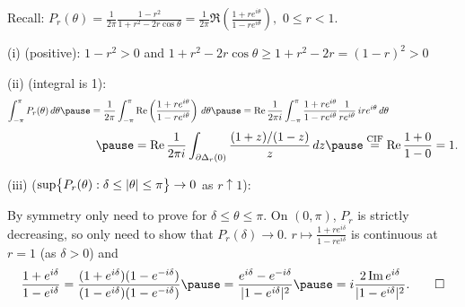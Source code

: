 \documentclass[10pt,aspectratio=169]{beamer}
\begin{document}
\begin{frame}
Recall: $
P_r(\theta)
= \frac{1}{2\pi} \frac{1-r^2}{1+r^2-2r \cos \theta}
= \frac{1}{2\pi}
\Re \left( \frac{1+re^{i\theta}}{1-re^{i\theta}}\right) ,
$
\quad
$0 \leq r < 1$.
\pause
\medskip

(i) (positive): \quad $1-r^2 > 0$
\quad
and
\quad
$1+r^2-2r \cos\theta \geq 1+r^2-2r = {(1-r)}^2 > 0$

\medskip
\pause

(ii) (integral is 1):
\[
\int_{-\pi}^{\pi}
P_r(\theta) \, d\theta
\pause
=
\frac{1}{2\pi}
\int_{-\pi}^{\pi}
\Re
\left(
\frac{1+re^{i\theta}}{1-re^{i\theta}}
\right)
\, d\theta
\pause
=
\Re
\frac{1}{2\pi i}
\int_{-\pi}^{\pi}
\frac{1+re^{i\theta}}{1-re^{i\theta}} \frac{1}{re^{i\theta}} \,
ire^{i\theta}
\, d\theta
\hspace*{1in}
\]
\[
\hspace*{1in}
\pause
= 
\Re
\frac{1}{2\pi i}
\int_{\partial \Delta_r(0)}
\frac{(1+z)/(1-z)}{z} \, dz
\pause
\overset{\text{CIF}}{=}
\Re \frac{1+0}{1-0} = 1 .
\]
\pause

(iii) ($\sup \bigl\{P_r(\theta) : \delta \leq \left\lvert {\theta} \right\rvert \leq
\pi \bigr\} \to 0$ as $r \uparrow 1$):


\pause
By symmetry only need to prove for $\delta \leq \theta \leq \pi$.
\pause
\quad
On $(0,\pi)$, $P_r$ is strictly decreasing, so only need to show
that $P_r(\delta) \to 0$.
\pause
\quad
$r \mapsto
\frac{1+re^{i\delta}}{1-re^{i\delta}}$
is continuous at $r=1$ (as $\delta > 0$) and \pause
\[
\frac{1+e^{i\delta}}{1-e^{i\delta}}
=
\frac{(1+e^{i\delta})(1-e^{-i\delta})}{(1-e^{i\delta})(1-e^{-i\delta})}
\pause
=
\frac{e^{i\delta}-e^{-i\delta}}{\sabs{1-e^{i\delta}}^2}
\pause
=
i \frac{2\Im e^{i\delta}}{\sabs{1-e^{i\delta}}^2} . \qed
\]
\end{frame}
\end{document}
